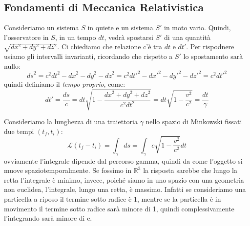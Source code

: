 \subsection{Fondamenti di Meccanica Relativistica}\label{sec:1.6}
Consideriamo un sistema $S$ in quiete e un sistema $S'$ in moto vario. Quindi, l'osservatore in $S$, in un tempo $dt$, vedrà spostarsi $S'$ di una quantità $\sqrt{dx^2+dy^2+dz^2}$. Ci chiediamo che relazione c'è tra $dt$ e $dt'$. Per rispodnere usiamo gli intervalli invarianti, ricordando che rispetto a $S'$ lo spostamento sarà nullo:
\begin{equation*}
    {ds}^2=c^2{dt}^2-{dx}^2-{dy}^2-{dz}^2=c^2{dt'}^2-{dx'}^2-{dy'}^2-{dz'}^2=c^2{dt'}^2
\end{equation*}
    quindi definiamo il \textit{tempo proprio}, come:
\begin{equation}
    dt'=\dfrac{ds}{c}=dt\sqrt{1-\dfrac{{dx}^2+{dy}^2+{dz}^2}{c^2{dt}^2}}=dt\sqrt{1-\dfrac{{v}^2}{c^2}}=\dfrac{dt}{\gamma}
\end{equation}

Consideriamo la lunghezza di una traiettoria $\gamma$ nello spazio di Minkowski fissati due tempi $(t_f,t_i)$: 
\begin{equation*}
    \mathcal{L}(t_f-t_i)=\int_\gamma ds=\int_\gamma c\sqrt{1-\dfrac{v^2}{c^2}}dt
\end{equation*}
ovviamente l'integrale dipende dal percorso gamma, quindi da come l'oggetto si muove spaziotemporalmente. Se fossimo in $\mathbb{R}^3$ la risposta sarebbe che lungo la retta l'integrale è minimo, invece, poiché siamo in uno spazio con una geometria non euclidea, l'integrale, lungo una retta, è massimo. Infatti se consideriamo una particella a riposo il termine sotto radice è 1, mentre se la particella è in movimento il termine sotto radice sarà minore di 1, quindi complessivamente l'integrando sarà minore di c.

